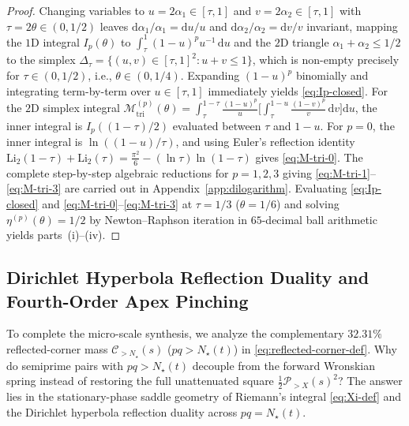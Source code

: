\documentclass[11pt,reqno]{amsart}
\theoremstyle{definition}
\theoremstyle{remark}
\numberwithin{equation}{section}
\newcommand{\dd}{\mathrm{d}}
\newcommand{\Li}{\mathrm{Li}}
\newcommand{\tri}{\mathrm{tri}}
\begin{document}
\begin{proof}
Changing variables to $u = 2\alpha_1 \in [\tau,1]$ and $v = 2\alpha_2 \in [\tau,1]$ with $\tau = 2\theta \in (0,1/2)$ leaves $\dd\alpha_1/\alpha_1 = \dd u/u$ and $\dd\alpha_2/\alpha_2 = \dd v/v$ invariant, mapping the $1$D integral $I_p(\theta)$ to $\int_\tau^1 (1-u)^p u^{-1}\,\dd u$ and the $2$D triangle $\alpha_1+\alpha_2 \le 1/2$ to the simplex $\Delta_\tau = \{(u,v) \in [\tau,1]^2 : u+v \le 1\}$, which is non-empty precisely for $\tau \in (0,1/2)$, i.e., $\theta \in (0,1/4)$. Expanding $(1-u)^p$ binomially and integrating term-by-term over $u \in [\tau,1]$ immediately yields \eqref{eq:Ip-closed}. For the $2$D simplex integral $\mathcal{M}_{\tri}^{(p)}(\theta) = \int_\tau^{1-\tau} \frac{(1-u)^p}{u}\bigl[\int_\tau^{1-u} \frac{(1-v)^p}{v}\,\dd v\bigr]\dd u$, the inner integral is $I_p((1-\tau)/2)$ evaluated between $\tau$ and $1-u$. For $p=0$, the inner integral is $\ln((1-u)/\tau)$, and using Euler's reflection identity $\Li_2(1-\tau) + \Li_2(\tau) = \frac{\pi^2}{6} - (\ln\tau)\ln(1-\tau)$ \cite{Lewin1981} gives \eqref{eq:M-tri-0}. The complete step-by-step algebraic reductions for $p=1,2,3$ giving \eqref{eq:M-tri-1}--\eqref{eq:M-tri-3} are carried out in Appendix~\ref{app:dilogarithm}. Evaluating \eqref{eq:Ip-closed} and \eqref{eq:M-tri-0}--\eqref{eq:M-tri-3} at $\tau = 1/3$ ($\theta=1/6$) and solving $\eta^{(p)}(\theta) = 1/2$ by Newton--Raphson iteration in $65$-decimal ball arithmetic yields parts~(i)--(iv).
\end{proof}

\subsection{Dirichlet Hyperbola Reflection Duality and Fourth-Order Apex Pinching}\label{subsec:hyperbola-duality}

To complete the micro-scale synthesis, we analyze the complementary $32.31\%$ reflected-corner mass $\mathcal{C}_{>N_\star}(s)$ ($pq > N_\star(t)$) in \eqref{eq:reflected-corner-def}. Why do semiprime pairs with $pq > N_\star(t)$ decouple from the forward Wronskian spring instead of restoring the full unattenuated square $\frac{1}{2}\mathcal{P}_{>X}(s)^2$? The answer lies in the stationary-phase saddle geometry of Riemann's integral \eqref{eq:Xi-def} and the Dirichlet hyperbola reflection duality across $pq = N_\star(t)$.
\end{document}
